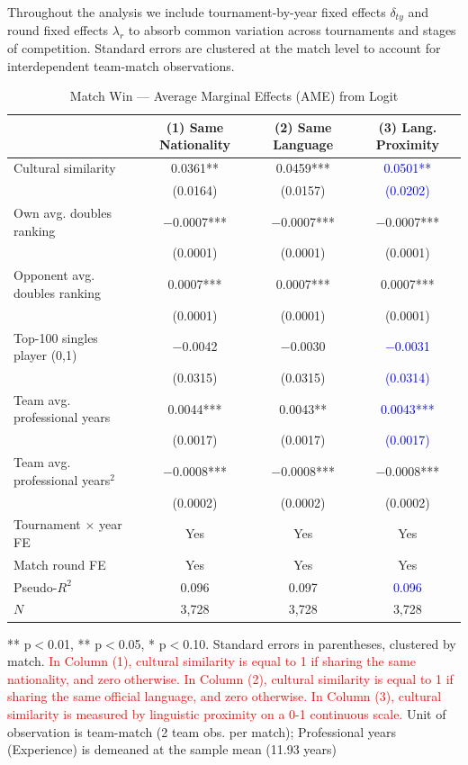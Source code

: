 \documentclass[10pt]{article}
\begin{document}
Throughout the analysis we include tournament-by-year fixed effects $\delta_{ty}$ and round fixed effects $\lambda_r$ to absorb common variation across tournaments and stages of competition. Standard errors are clustered at the match level to account for interdependent team-match observations.





\begin{table}[htbp]
\color{blue}
\centering
\caption{Match Win — Average Marginal Effects (AME) from Logit \label{tab:t3}}
\begin{threeparttable}
\begin{tabular}{lccc}
\toprule
 & (1) Same Nationality & (2) Same Language & (3) Lang. Proximity \\
\midrule
Cultural similarity & 0.0361** & 0.0459*** & \textcolor{blue}{0.0501**} \\
 & (0.0164) & (0.0157) & \textcolor{blue}{(0.0202)} \\
Own avg. doubles ranking & $-$0.0007*** & $-$0.0007*** & $-$0.0007*** \\
 & (0.0001) & (0.0001) & (0.0001) \\
Opponent avg. doubles ranking & 0.0007*** & 0.0007*** & 0.0007*** \\
 & (0.0001) & (0.0001) & (0.0001) \\
Top-100 singles player (0,1)& $-$0.0042 & $-$0.0030 & \textcolor{blue}{$-$0.0031} \\
 & (0.0315) & (0.0315) & \textcolor{blue}{(0.0314)} \\
Team avg. professional years  & 0.0044*** & 0.0043** & \textcolor{blue}{0.0043***} \\
 & (0.0017) & (0.0017) & \textcolor{blue}{(0.0017)} \\
Team avg. professional years$^2$  & $-$0.0008*** & $-$0.0008*** & $-$0.0008*** \\
 & (0.0002) & (0.0002) & (0.0002) \\
\midrule
Tournament $\times$ year FE & Yes & Yes & Yes \\
Match round FE & Yes & Yes & Yes \\
Pseudo-$R^2$ & 0.096 & 0.097 & \textcolor{blue}{0.096} \\
$N$ & 3,728 & 3,728 & 3,728 \\
\bottomrule
\end{tabular}
\begin{tablenotes}
\small
\item *** p$<$0.01, ** p$<$0.05, * p$<$0.10. Standard errors in parentheses, clustered by match. \textcolor{red}{In Column (1), cultural similarity is equal to 1 if sharing the same nationality, and zero otherwise. In Column (2), cultural similarity is equal to 1 if sharing the same official language, and zero otherwise. In Column (3), cultural similarity is measured by linguistic proximity on a 0-1 continuous scale.} Unit of observation is team-match (2 team obs. per match); Professional years (Experience) is demeaned at the sample mean (11.93 years)

\end{tablenotes}
\end{threeparttable}
\end{table}
\end{document}
